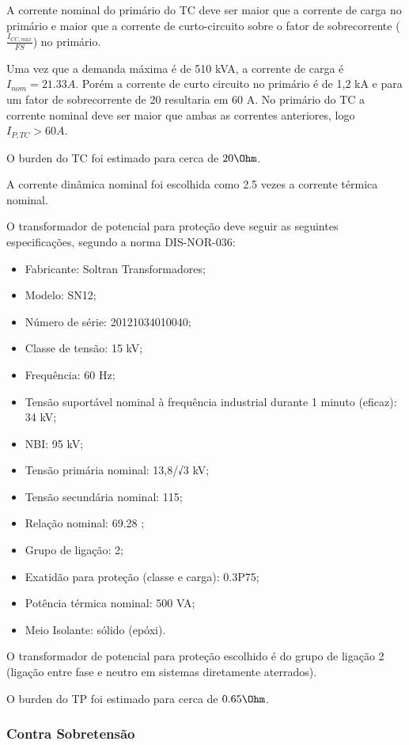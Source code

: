 A corrente nominal do primário do TC deve ser maior que a corrente de carga no primário e maior que a corrente de curto-circuito sobre o fator de sobrecorrente ($\frac{I_{CC,máx}}{FS}$) no primário.

Uma vez que a demanda máxima é de 510 kVA, a corrente de carga é $I_{nom} = 21.33 A$. Porém a corrente de curto circuito no primário é de 1,2 kA e para um fator de sobrecorrente de 20 resultaria em 60 A. No primário do TC a corrente nominal deve ser maior que ambas as correntes anteriores, logo $I_{P,TC} > 60 A$.

O burden do TC foi estimado para cerca de $20 \Ohm$.

A corrente dinâmica nominal foi escolhida como 2.5 vezes a corrente térmica nominal.

O transformador de potencial para proteção deve seguir as seguintes especificações, segundo a norma DIS-NOR-036:

\begin{itemize}
    \item Fabricante: Soltran Transformadores;
    \item Modelo: SN12;
    \item Número de série: 20121034010040;
    \item Classe de tensão: 15 kV;
    \item Frequência: 60 Hz;
    \item Tensão suportável nominal à frequência industrial durante 1 minuto (eficaz): 34 kV;
    \item NBI: 95 kV;
    \item Tensão primária nominal: 13,8/√3 kV;
    \item Tensão secundária nominal: 115;
    \item Relação nominal:  69.28 ;
    \item Grupo de ligação: 2;
    \item Exatidão para proteção (classe e carga): 0.3P75;
    \item Potência térmica nominal: 500 VA;
    \item Meio Isolante: sólido (epóxi).
\end{itemize}

O transformador de potencial para proteção escolhido é do grupo de ligação 2 (ligação entre fase e neutro em sistemas diretamente aterrados).

O burden do TP foi estimado para cerca de $0.65 \Ohm$.

\subsubsection{Contra Sobretensão}

